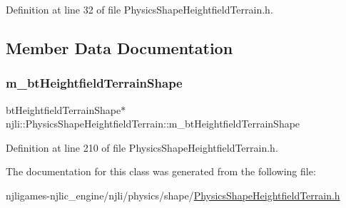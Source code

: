 Definition at line 32 of file Physics\+Shape\+Heightfield\+Terrain.\+h.



\subsection{Member Data Documentation}
\mbox{\label{classnjli_1_1_physics_shape_heightfield_terrain_aea1853b1ab3d6cfab816b4e8a70827d9}} 
\subsubsection{\texorpdfstring{m\+\_\+bt\+Heightfield\+Terrain\+Shape}{m\_btHeightfieldTerrainShape}}
{\footnotesize\ttfamily bt\+Heightfield\+Terrain\+Shape$\ast$ njli\+::\+Physics\+Shape\+Heightfield\+Terrain\+::m\+\_\+bt\+Heightfield\+Terrain\+Shape\hspace{0.3cm}{\ttfamily [private]}}



Definition at line 210 of file Physics\+Shape\+Heightfield\+Terrain.\+h.



The documentation for this class was generated from the following file\+:\begin{DoxyCompactItemize}
\item 
njligames-\/njlic\+\_\+engine/njli/physics/shape/\mbox{\hyperlink{_physics_shape_heightfield_terrain_8h}{Physics\+Shape\+Heightfield\+Terrain.\+h}}\end{DoxyCompactItemize}
